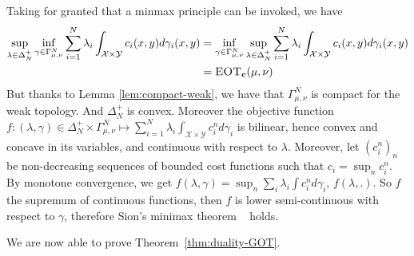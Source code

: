 \begin{prv*}
Taking for granted that a minmax principle can be invoked, we have
\begin{align*}
    \sup_{\lambda\in\Delta_N^{+}}\inf_{\gamma\in\Gamma_{\mu,\nu}^N} \sum_{i=1}^N\lambda_i\int_{\mathcal{X}\times\mathcal{Y}}c_i(x,y)d\gamma_i(x,y) &= \inf_{\gamma\in\Gamma_{\mu,\nu}^N}\sup_{\lambda\in \Delta_N^{+}} \sum_{i=1}^N\lambda_i\int_{\mathcal{X}\times\mathcal{Y}}c_i(x,y)d\gamma_i(x,y)\\
    &=\textsc{EOT}_{\mathbf{c}}(\mu,\nu)
\end{align*}
But thanks to Lemma \ref{lem:compact-weak}, we have that $\Gamma_{\mu,\nu}^N$ is compact for the weak topology. And $\Delta^+_N$ is convex. Moreover the objective function $f:(\lambda,\gamma)\in\Delta^+_N\times\Gamma^N_{\mu,\nu} \mapsto \sum_{i=1}^N\lambda_i \int_{\mathcal{X}\times \mathcal{Y}} c^n_id\gamma_i$ is bilinear, hence convex and concave  in its variables, and continuous with respect to $\lambda$. Moreover, let $(c^n_i)_n$ be non-decreasing sequences of bounded cost functions such that $c_i=\sup_n c^n_i$. By monotone convergence, we get $f(\lambda,\gamma) = \sup_n \sum_i\lambda_i \int c^n_i d\gamma_i$, $f(\lambda,.)$. So $f$ the supremum of continuous functions, then $f$ is lower semi-continuous with respect to $\gamma$, therefore Sion's minimax theorem
~\citep{sion1958} holds.

\end{prv*}

We are now able to prove Theorem~\ref{thm:duality-GOT}.

